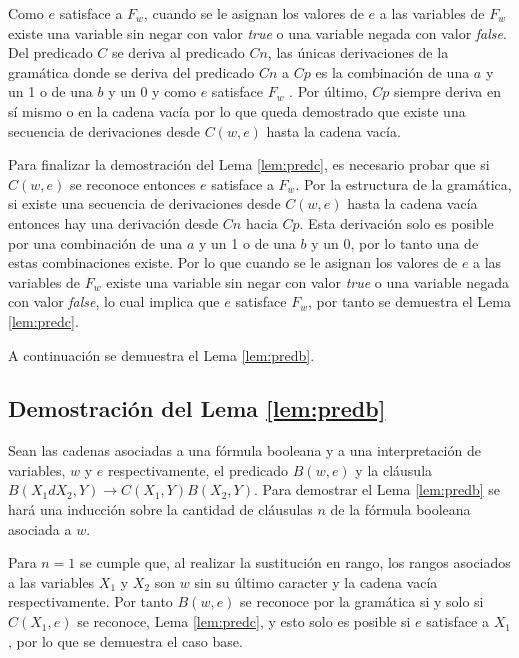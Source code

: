 \documentclass[12pt]{article}
\newcommand{\true}{\textit{true}}
\newcommand{\false}{\textit{false}}
\begin{document}
Como $e$ satisface a $F_w$, cuando se le asignan los valores de $e$ a las variables de $F_w$ existe una variable 
sin negar con valor \true{} o una variable negada con valor \false{}. Del predicado $C$ se deriva al predicado 
$Cn$, las únicas derivaciones de la gramática donde se deriva del predicado $Cn$ a $Cp$ es la combinación de una 
$a$ y un 1 o de una $b$ y un 0 y como $e$ satisface $F_w$ .  Por último, $Cp$ siempre deriva en sí mismo o en la cadena vacía por lo que queda demostrado que existe una secuencia de derivaciones desde $C(w,e)$ hasta la cadena vacía.

Para finalizar la demostración del Lema \ref{lem:predc}, es necesario probar que si $C(w,e)$ se reconoce entonces $e$ satisface a $F_w$. Por la estructura de la gramática, si existe una secuencia de derivaciones desde $C(w,e)$ hasta la cadena vacía entonces hay una derivación desde $Cn$ hacia $Cp$. Esta derivación solo es posible por una combinación de una $a$ y un 1 o de una $b$ y un 0, por lo tanto una de estas combinaciones existe. Por lo que cuando se le asignan los valores de $e$ a las variables de $F_w$ existe una variable 
sin negar con valor \true{} o una variable negada con valor \false{}, lo cual implica que $e$ satisface $F_w$, por tanto se demuestra el Lema \ref{lem:predc}.

A continuación se demuestra el Lema \ref{lem:predb}.

\subsection{Demostración del Lema \ref{lem:predb}}

Sean las cadenas asociadas a una fórmula booleana y a una interpretación de variables, $w$ y $e$
respectivamente, el predicado $B(w,e)$ y la cláusula $B(X_1dX_2,Y)\to C(X_1,Y) B(X_2,Y)$. Para demostrar el 
Lema \ref{lem:predb} se hará una inducción sobre la cantidad de cláusulas $n$ de la fórmula booleana asociada a 
$w$. 

Para $n=1$ se cumple que, al realizar la sustitución en rango, los rangos asociados a las variables $X_1$ y $X_2$ son $w$
sin su último caracter y la cadena vacía respectivamente. Por tanto $B(w,e)$ se reconoce por la gramática si 
y solo si $C(X_1,e)$ se reconoce, Lema \ref{lem:predc}, y esto solo es posible si $e$ satisface a $X_1$, por lo que se demuestra 
el caso base.
\end{document}
